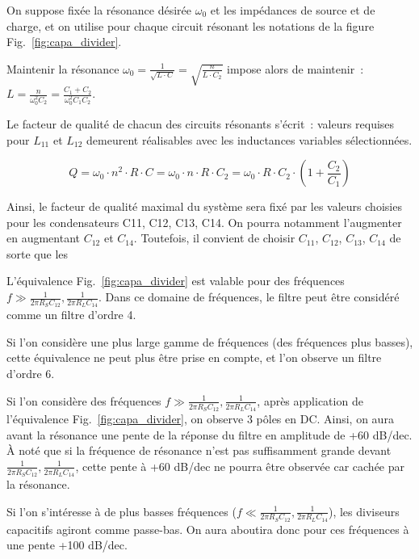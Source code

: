 \documentclass{article}
\begin{document}

On suppose fixée la résonance désirée $\omega_0$ et les impédances de source et de charge, et on utilise pour chaque circuit résonant les notations de la figure Fig.~\ref{fig:capa_divider}.

Maintenir la résonance ${\omega_0 = \frac{1}{\sqrt{L\cdot C}} = \sqrt{\frac{n}{L\cdot C_2}}}$ impose alors de maintenir~: ${L = \frac{n}{\omega_0^2 C_2} =\frac{C_1+C_2}{\omega_0^2 C_1 C_2}}$.

Le facteur de qualité de chacun des circuits résonants s'écrit~:  valeurs requises pour $L_{11}$ et $L_{12}$ demeurent réalisables avec les inductances variables sélectionnées.


\begin{equation*}
Q = \omega_0\cdot n^2\cdot R\cdot C = \omega_0\cdot n\cdot R\cdot C_2 = \omega_0\cdot R\cdot C_2\cdot (1+\frac{C_2}{C_1})
\end{equation*}

Ainsi, le facteur de qualité maximal du système sera fixé par les valeurs choisies pour les condensateurs C11, C12, C13, C14. On pourra notamment l'augmenter en augmentant $C_{12}$ et $C_{14}$. Toutefois, il convient de choisir $C_{11}$, $C_{12}$, $C_{13}$, $C_{14}$ de sorte que les

L'équivalence Fig.~\ref{fig:capa_divider} est valable pour des fréquences ${f \gg \frac{1}{2\pi R_S C_{12}}, \frac{1}{2\pi R_L C_{14}}}$. Dans ce domaine de fréquences, le filtre peut être considéré comme un filtre d'ordre 4.

Si l'on considère une plus large gamme de fréquences (des fréquences plus basses), cette équivalence ne peut plus être prise en compte, et l'on observe un filtre d'ordre 6.



Si l'on considère des fréquences ${f \gg \frac{1}{2\pi R_S C_{12}}, \frac{1}{2\pi R_L C_{14}}}$, après application de l'équivalence Fig.~\ref{fig:capa_divider}, on observe 3 pôles en DC. Ainsi, on aura avant la résonance une pente de la réponse du filtre en amplitude de +60 dB/dec. À noté que si la fréquence de résonance n'est pas suffisamment grande devant ${\frac{1}{2\pi R_S C_{12}}, \frac{1}{2\pi R_L C_{14}}}$, cette pente à +60 dB/dec ne pourra être observée car cachée par la résonance.

Si l'on s'intéresse à de plus basses fréquences (${f \ll \frac{1}{2\pi R_S C_{12}}, \frac{1}{2\pi R_L C_{14}}}$), les diviseurs capacitifs agiront comme passe-bas. On aura aboutira donc pour ces fréquences à une pente +100 dB/dec.
\end{document}
